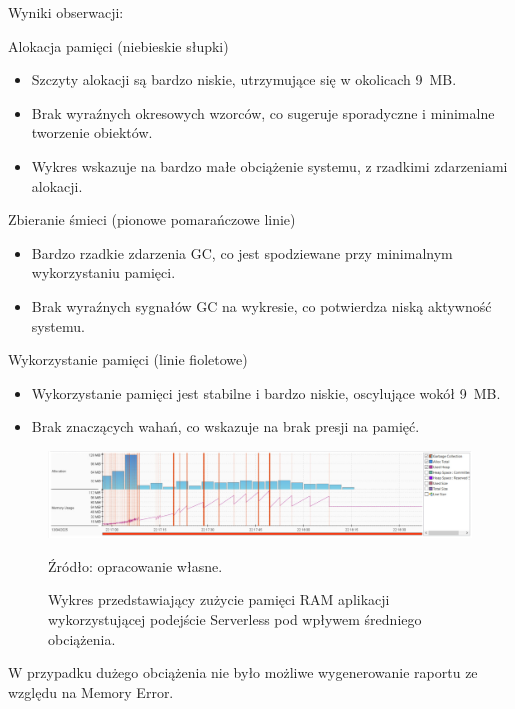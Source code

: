 \documentclass[runningheads,12pt]{llncs}
\begin{document}
Wyniki obserwacji:

Alokacja pamięci (niebieskie słupki)

\begin{itemize}
    \item Szczyty alokacji są bardzo niskie, utrzymujące się w okolicach 9~MB.
    \item Brak wyraźnych okresowych wzorców, co sugeruje sporadyczne i minimalne tworzenie obiektów.
    \item Wykres wskazuje na bardzo małe obciążenie systemu, z rzadkimi zdarzeniami alokacji.
\end{itemize}

Zbieranie śmieci (pionowe pomarańczowe linie)

\begin{itemize}
    \item Bardzo rzadkie zdarzenia GC, co jest spodziewane przy minimalnym wykorzystaniu pamięci.
    \item Brak wyraźnych sygnałów GC na wykresie, co potwierdza niską aktywność systemu.
\end{itemize}

Wykorzystanie pamięci (linie fioletowe)

\begin{itemize}
    \item Wykorzystanie pamięci jest stabilne i bardzo niskie, oscylujące wokół 9~MB.
    \item Brak znaczących wahań, co wskazuje na brak presji na pamięć.
\end{itemize}

\newpage

\begin{figure}
    \includegraphics[width=\linewidth]{images/serverless-memory-middle-graph.jpg}
    \caption{Wykres przedstawiający zużycie pamięci RAM aplikacji wykorzystującej podejście Serverless pod wpływem średniego obciążenia.} \label{fig1}
    \vspace{0.5em}
    {\small Źródło: opracowanie własne.}
\end{figure}

W przypadku dużego obciążenia nie było możliwe wygenerowanie raportu ze względu na Memory Error.
\end{document}
